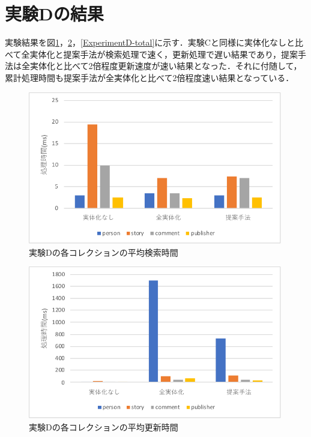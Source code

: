 \documentclass[a4paper,11pt]{ujreport}
\begin{document}
\section{実験Dの結果}
実験結果を図\ref{ExperimentD-find}，\ref{ExperimentD-update}，\ref{ExperimentD-total}に示す．実験Cと同様に実体化なしと比べて全実体化と提案手法が検索処理で速く，更新処理で遅い結果であり，提案手法は全実体化と比べて2倍程度更新速度が速い結果となった．それに付随して，累計処理時間も提案手法が全実体化と比べて2倍程度速い結果となっている．
\begin{figure}[htbp]
	\begin{center}
		\includegraphics[width=30em]{src/ExperimentD-find.pdf} %
	\end{center}
	\caption{実験Dの各コレクションの平均検索時間}
	\label{ExperimentD-find}
\end{figure}
\begin{figure}[htbp]
	\begin{center}
		\includegraphics[width=30em]{src/ExperimentD-update.pdf} %
	\end{center}
	\caption{実験Dの各コレクションの平均更新時間}
	\label{ExperimentD-update}
\end{figure}
\end{document}
